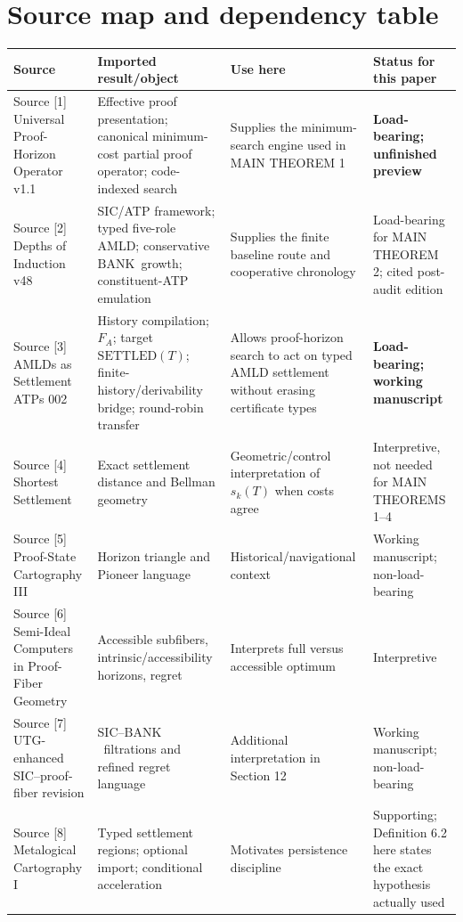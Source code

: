 \documentclass[11pt]{article}
\theoremstyle{definition}
\newcommand{\BANK}{\ensuremath{\mathrm{BANK}}}
\newcommand{\SETTLED}{\ensuremath{\mathrm{SETTLED}}}
\begin{document}
\section{Source map and dependency table}
\begingroup
\footnotesize
\setlength{\tabcolsep}{3pt}
\begin{longtable}{@{}p{}p{}p{}p{}@{}}
\toprule
\textbf{Source} & \textbf{Imported result/object} & \textbf{Use here} & \textbf{Status for this paper}\\
\midrule
\endhead
Source [1] Universal Proof-Horizon Operator v1.1 & Effective proof presentation; canonical minimum-cost partial proof operator; code-indexed search & Supplies the minimum-search engine used in MAIN THEOREM 1 & \textbf{Load-bearing; unfinished preview}\\
\addlinespace
Source [2] Depths of Induction v48 & SIC/ATP framework; typed five-role AMLD; conservative \BANK\ growth; constituent-ATP emulation & Supplies the finite baseline route and cooperative chronology & Load-bearing for MAIN THEOREM 2; cited post-audit edition\\
\addlinespace
Source [3] AMLDs as Settlement ATPs 002 & History compilation; $F_A$; target $\SETTLED(T)$; finite-history/derivability bridge; round-robin transfer & Allows proof-horizon search to act on typed AMLD settlement without erasing certificate types & \textbf{Load-bearing; working manuscript}\\
\addlinespace
Source [4] Shortest Settlement & Exact settlement distance and Bellman geometry & Geometric/control interpretation of $s_k(T)$ when costs agree & Interpretive, not needed for MAIN THEOREMS 1--4\\
\addlinespace
Source [5] Proof-State Cartography III & Horizon triangle and Pioneer language & Historical/navigational context & Working manuscript; non-load-bearing\\
\addlinespace
Source [6] Semi-Ideal Computers in Proof-Fiber Geometry & Accessible subfibers, intrinsic/accessibility horizons, regret & Interprets full versus accessible optimum & Interpretive\\
\addlinespace
Source [7] UTG-enhanced SIC--proof-fiber revision & SIC--\BANK\ filtrations and refined regret language & Additional interpretation in Section 12 & Working manuscript; non-load-bearing\\
\addlinespace
Source [8] Metalogical Cartography I & Typed settlement regions; optional import; conditional acceleration & Motivates persistence discipline & Supporting; Definition 6.2 here states the exact hypothesis actually used\\
\bottomrule
\end{longtable}
\endgroup
\end{document}
